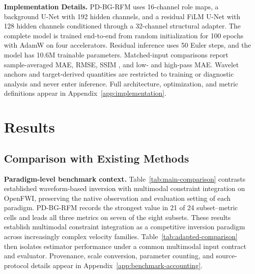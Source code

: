\textbf{Implementation Details.} PD-BG-RFM uses 16-channel role maps, a background U-Net with 192 hidden channels, and a residual FiLM U-Net with 128 hidden channels conditioned through a 32-channel structural adapter. The complete model is trained end-to-end from random initialization for 100 epochs with AdamW \cite{loshchilov2019decoupled} on four accelerators. Residual inference uses 50 Euler steps, and the model has 10.6M trainable parameters. Matched-input comparisons report sample-averaged MAE, RMSE, SSIM \cite{wang2004ssim}, and low- and high-pass MAE. Wavelet anchors and target-derived quantities are restricted to training or diagnostic analysis and never enter inference. Full architecture, optimization, and metric definitions appear in Appendix~\ref{app:implementation}.


\section{Results}

\subsection{Comparison with Existing Methods}
\textbf{Paradigm-level benchmark context.} Table~\ref{tab:main-comparison} contrasts established waveform-based inversion with multimodal constraint integration on OpenFWI, preserving the native observation and evaluation setting of each paradigm. PD-BG-RFM records the strongest value in 21 of 24 subset--metric cells and leads all three metrics on seven of the eight subsets. These results establish multimodal constraint integration as a competitive inversion paradigm across increasingly complex velocity families. Table~\ref{tab:adapted-comparison} then isolates estimator performance under a common multimodal input contract and evaluator. Provenance, scale conversion, parameter counting, and source-protocol details appear in Appendix~\ref{app:benchmark-accounting}.


